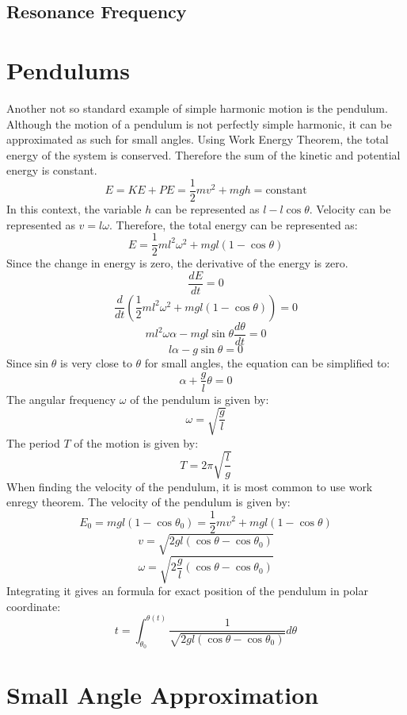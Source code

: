 \documentclass[11pt]{article}
\begin{document}
 	
 	\subsection{Resonance Frequency}
 
 	
\section{Pendulums}
    Another not so standard example of simple harmonic motion is the
    pendulum. Although the motion of a pendulum is not perfectly simple harmonic,
    it can be approximated as such for small angles.
    Using Work Energy Theorem, the total energy of the system is conserved.
    Therefore the sum of the kinetic and potential energy is constant.
    \[E = KE + PE = \frac{1}{2} m v^2 + mgh = \text{constant}\]
    In this context, the variable $h$ can be represented as $l - l\cos\theta$.
    Velocity can be represented as $v = l\omega$.
    Therefore, the total energy can be represented as:
    \[E = \frac{1}{2} m l^2 \omega^2 + mgl(1 - \cos\theta)\]
    Since the change in energy is zero, the derivative of the energy is zero.
    \[\frac{dE}{dt} = 0\]
    \[\frac{d}{dt} \left(\frac{1}{2} m l^2 \omega^2 + mgl(1 - \cos\theta)\right) = 0\]
    \[m l^2 \omega \alpha - mgl\sin\theta \frac{d\theta}{dt} = 0\]
    \[l \alpha - g\sin\theta = 0\]
    Since$\sin \theta$ is very close to $\theta$ for small angles, the equation can be simplified to:
    \[\alpha + \frac{g}{l} \theta = 0\]
    The angular frequency $\omega$ of the pendulum is given by:
    \[\omega = \sqrt{\frac{g}{l}}\]
    The period $T$ of the motion is given by:
    \[T = 2\pi\sqrt{\frac{l}{g}}\]
    When finding the velocity of the pendulum, it is most common to use work
    enregy theorem. The velocity of the pendulum is given by:
    \[E_0 = mgl(1-\cos \theta _0) =  \frac{1}{2} m v^2 + mgl(1 - \cos\theta)\]
    \[v = \sqrt{2gl( \cos\theta -\cos \theta_0 )}\]
    \[\omega = \sqrt{2\frac{g}{l}( \cos\theta -\cos \theta_0 )}\]
    Integrating it gives an formula for exact position of the pendulum in polar coordinate:
   	\[t = \int_{\theta_0}^{\theta(t)} \frac{1}{\sqrt{2gl( \cos\theta -\cos \theta_0 )}} d \theta\] 
    
\section{Small Angle Approximation}

\appendix
\end{document}
